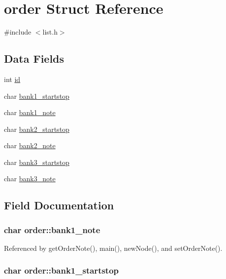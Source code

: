 \hypertarget{structorder}{\section{order Struct Reference}
\label{structorder}
}


{\ttfamily \#include $<$list.\-h$>$}

\subsection*{Data Fields}
\begin{DoxyCompactItemize}
\item 
int \hyperlink{structorder_a4328e44fed73692e76eb23049f1d972a}{id}
\item 
char \hyperlink{structorder_a8c533b3d1568db6bb3132be3a58b14ee}{bank1\-\_\-startstop}
\item 
char \hyperlink{structorder_a0a9f68e4094dfe71346d413df3c5f722}{bank1\-\_\-note}
\item 
char \hyperlink{structorder_aa07172101a0760b7b19335fe24f9e462}{bank2\-\_\-startstop}
\item 
char \hyperlink{structorder_adc801e65b34bd19e8db0decc145bc791}{bank2\-\_\-note}
\item 
char \hyperlink{structorder_a92057c9ceb6ae7cc28814e5a8b3ff3e2}{bank3\-\_\-startstop}
\item 
char \hyperlink{structorder_aed04b397690a0528443e701f41a99e8f}{bank3\-\_\-note}
\end{DoxyCompactItemize}


\subsection{Field Documentation}
\hypertarget{structorder_a0a9f68e4094dfe71346d413df3c5f722}{
\subsubsection[{bank1\-\_\-note}]{\setlength{\rightskip}{0pt plus 5cm}char order\-::bank1\-\_\-note}}\label{structorder_a0a9f68e4094dfe71346d413df3c5f722}


Referenced by get\-Order\-Note(), main(), new\-Node(), and set\-Order\-Note().

\hypertarget{structorder_a8c533b3d1568db6bb3132be3a58b14ee}{
\subsubsection[{bank1\-\_\-startstop}]{\setlength{\rightskip}{0pt plus 5cm}char order\-::bank1\-\_\-startstop}}\label{structorder_a8c533b3d1568db6bb3132be3a58b14ee}


